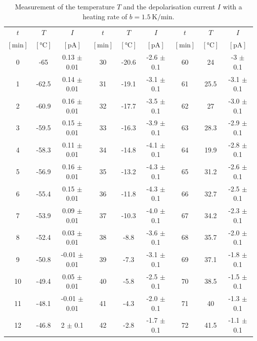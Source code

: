 \begin{table}[H]
  \centering
  \caption{Measurement of the temperature $T$ and the depolarisation current $I$ with a heating rate of $b=\qty{1.5}{\kelvin\per\minute}$.}
  \begin{tabular}{ccc|ccc|ccc}
  \toprule
  $t$ & $T$ & $I$ & $t$ & $T$ & $I$ & $t$ & $T$ & $I$ \\
  $[\mathrm{min}]$ & $[\unit{\celsius}]$ & $[\unit{\pico\ampere}]$ & $[\mathrm{min}]$ & $[\unit{\celsius}]$ & $[\unit{\pico\ampere}]$ & $[\mathrm{min}]$ & $[\unit{\celsius}]$ & $[\unit{\pico\ampere}]$ \\
  \midrule
  0   & -65    &   0.13  $\pm$  0.01   &   30  &  -20.6  & -2.6  $\pm$  0.1   &    60  &  24     & -3    $\pm$  0.1   \\
  1   & -62.5  &   0.14  $\pm$  0.01   &   31  &  -19.1  & -3.1  $\pm$  0.1   &    61  &  25.5   & -3.1  $\pm$  0.1   \\
  2   & -60.9  &   0.16  $\pm$  0.01   &   32  &  -17.7  & -3.5  $\pm$  0.1   &    62  &  27     & -3.0  $\pm$  0.1   \\
  3   & -59.5  &   0.15  $\pm$  0.01   &   33  &  -16.3  & -3.9  $\pm$  0.1   &    63  &  28.3   & -2.9  $\pm$  0.1   \\
  4   & -58.3  &   0.11  $\pm$  0.01   &   34  &  -14.8  & -4.1  $\pm$  0.1   &    64  &  19.9   & -2.8  $\pm$  0.1   \\
  5   & -56.9  &   0.16  $\pm$  0.01   &   35  &  -13.2  & -4.3  $\pm$  0.1   &    65  &  31.2   & -2.6  $\pm$  0.1   \\
  6   & -55.4  &   0.15  $\pm$  0.01   &   36  &  -11.8  & -4.3  $\pm$  0.1   &    66  &  32.7   & -2.5  $\pm$  0.1   \\
  7   & -53.9  &   0.09  $\pm$  0.01   &   37  &  -10.3  & -4.0  $\pm$  0.1   &    67  &  34.2   & -2.3  $\pm$  0.1   \\
  8   & -52.4  &   0.03  $\pm$  0.01   &   38  &  -8.8   & -3.6  $\pm$  0.1   &    68  &  35.7   & -2.0  $\pm$  0.1   \\
  9   & -50.8  &   -0.01 $\pm$  0.01   &   39  &  -7.3   & -3.1  $\pm$  0.1   &    69  &  37.1   & -1.8  $\pm$  0.1   \\
  10  & -49.4  &   0.05  $\pm$  0.01   &   40  &  -5.8   & -2.5  $\pm$  0.1   &    70  &  38.5   & -1.5  $\pm$  0.1   \\
  11  & -48.1  &   -0.01 $\pm$  0.01   &   41  &  -4.3   & -2.0  $\pm$  0.1   &    71  &  40     & -1.3  $\pm$  0.1   \\
  12  & -46.8  &   2     $\pm$  0.1    &   42  &  -2.8   & -1.7  $\pm$  0.1   &    72  &  41.5   & -1.1  $\pm$  0.1   \\

\end{tabular}
\end{table}
